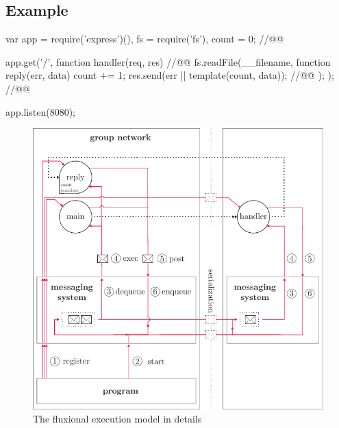 \subsection{Example}

\begin{code}[js,
  caption={Example web application},
  label={lst:source}]
var app = require('express')(),
    fs = require('fs'),
    count = 0; //@\label{lst:source-counter}@

app.get('/', function handler(req, res){ //@\label{lst:source-handler}@
  fs.readFile(__filename, function reply(err, data) {
    count += 1;
    res.send(err || template(count, data)); //@\label{lst:source-send}@
  });
}); //@\label{lst:source-handler-end}@

app.listen(8080);
\end{code}

\begin{figure}[h!]
  \centering
  \includegraphics[width=0.7\linewidth]{../resources/schema-message.pdf}
  \caption{The fluxional execution model in details}
  \label{fig:MesSys}
\end{figure}


